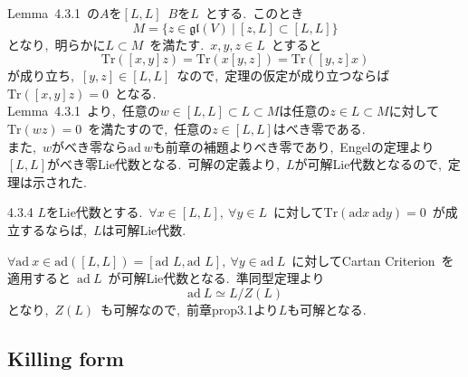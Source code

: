 \documentclass[uplatex,dvipdfmx]{jsarticle}
\begin{document}
\begin{myproof}
    Lemma~4.3.1~の$A$を$[L,L]$~$B$を$L$~とする.~このとき
    \begin{equation*}
        M=\{z\in \mathfrak{gl}(V)~|~[z,L] \subset [L,L]\}
    \end{equation*}
    となり,~明らかに$L\subset M$~を満たす.~$x,y,z\in L$~とすると
    \begin{equation*}
        \text{Tr}([x,y]z)=\text{Tr}(x[y,z])=\text{Tr}([y,z]x)
    \end{equation*}
    が成り立ち,~$[y,z]\in [L,L]$~なので,~定理の仮定が成り立つならば$\text{Tr}([x,y]z)=0$~となる.\\
    Lemma~4.3.1~より,~任意の$w\in [L,L]\subset L\subset M$は任意の$z\in L\subset M$に対して~$\text{Tr}(wz)=0$~を満たすので,~任意の$z\in [L,L]$はべき零である.\\
    また,~$w$がべき零なら$\text{ad}~w$も前章の補題よりべき零であり,~Engelの定理より$[L,L]$がべき零Lie代数となる.~可解の定義より,~$L$が可解Lie代数となるので,~定理は示された.
\end{myproof}
\begin{mycor}{4.3.4}
    $L$をLie代数とする.~$\forall x\in [L,L],~\forall y\in L$~に対して$\text{Tr}(\text{ad}x~\text{ad}y)=0$~が成立するならば,~$L$は可解Lie代数.
\end{mycor}
\begin{myproof}
    $\forall \text{ad}~x\in\text{ad}([L, L]) = [\text{ad } L, \text{ad } L],~\forall y\in \text{ad}~L$~に対してCartan Criterion~を適用すると~$\text{ad}~L$~が可解Lie代数となる.~準同型定理より
    \begin{equation*}
        \text{ad}~L\simeq L/Z(L)
    \end{equation*}
    となり,~$Z(L)$~も可解なので,~前章prop3.1より$L$も可解となる.
\end{myproof}
\newpage
\subsection{Killing form}
\end{document}
